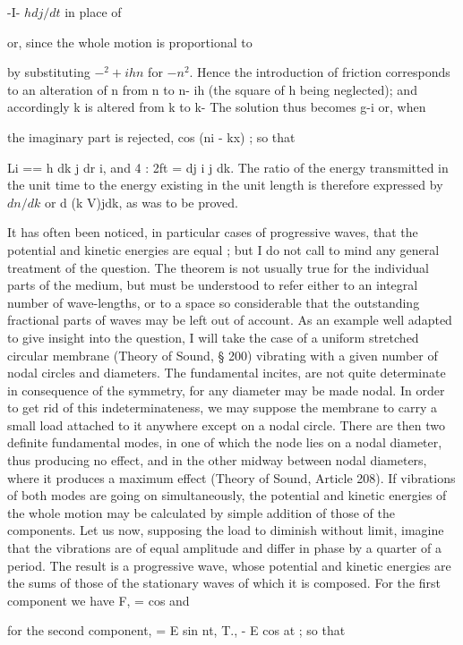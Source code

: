 -I- \(h dj/dt\)
in place of

or, since the whole motion is proportional to

by substituting \(-^2 + ihn\) for \(-n^2\).  Hence the introduction of
friction corresponds to an alteration of n from n to n- ih
(the square of h being neglected); and accordingly k is altered from k to
k-  The solution thus becomes g-i      or, when

the imaginary part is rejected, cos (ni - kx) ; so that

Li == h dk j dr i, and 4 : 2ft = dj i j dk. The ratio of the energy transmitted
in the unit time to the energy existing in the unit length is therefore
expressed by \(dn/dk\) or d (k V)jdk, as was to be proved.


It has often been noticed, in particular cases of progressive waves,
that the potential and kinetic energies are equal ; but I do not call to
mind any general treatment of the question. The theorem is not
usually true for the individual parts of the medium, but must be
understood to refer either to an integral number of wave-lengths, or to
a space so considerable that the outstanding fractional parts of waves
may be left out of account. As an example well adapted to give insight into the
question, I will take the case of a uniform stretched
circular membrane (Theory of Sound, § 200) vibrating with a given
number of nodal circles and diameters. The fundamental incites, are
not quite determinate in consequence of the symmetry, for any diameter may be
made nodal. In order to get rid of this indeterminateness, we may suppose the
membrane to carry a small load attached to
it anywhere except on a nodal circle. There are then two definite
fundamental modes, in one of which the node lies on a nodal diameter,
thus producing no effect, and in the other midway between nodal diameters,
where it produces a maximum effect (Theory of Sound, Article 208).
If vibrations of both modes are going on simultaneously, the
potential and kinetic energies of the whole motion may be calculated
by simple addition of those of the components. Let us now, supposing
the load to diminish without limit, imagine that the vibrations are of
equal amplitude and differ in phase by a quarter of a period. The
result is a progressive wave, whose potential and kinetic energies are
the sums of those of the stationary waves of which it is composed.
For the first component we have F, = cos and

for the second component, = E sin nt, T., - E cos at ; so that


